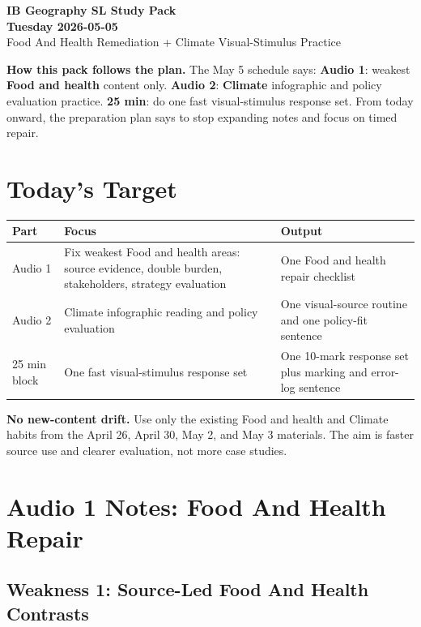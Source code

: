\documentclass[11pt,a4paper]{article}
\newcommand{\term}[1]{\textcolor{HeadingBlue}{\textbf{#1}}}
\newcommand{\boxnote}[3]{%
\noindent\colorbox{#1}{%
  \begin{minipage}{0.965\textwidth}
  \sffamily
  \textbf{\textcolor{HeadingBlue}{#2}} #3
  \end{minipage}
}}
\begin{document}
\begin{center}
  {\sffamily\bfseries\color{HeadingBlue}\LARGE IB Geography SL Study Pack}\\[0.25em]
  {\sffamily\bfseries\color{AccentTeal}\Large Tuesday 2026-05-05}\\[0.35em]
  {\sffamily\color{TextInk}Food And Health Remediation + Climate Visual-Stimulus Practice}
\end{center}

\boxnote{SoftBlue}{How this pack follows the plan.}{The May 5 schedule says:
\term{Audio 1}: weakest \term{Food and health} content only.
\term{Audio 2}: \term{Climate} infographic and policy evaluation practice.
\term{25 min}: do one fast visual-stimulus response set. From today onward,
the preparation plan says to stop expanding notes and focus on timed repair.}

\section{Today's Target}

\begin{tabularx}{\textwidth}{L{0.2\textwidth}Y L{0.25\textwidth}}
\toprule
\textbf{Part} & \textbf{Focus} & \textbf{Output} \\
\midrule
Audio 1 & Fix weakest Food and health areas: source evidence, double burden,
stakeholders, strategy evaluation & One Food and health repair checklist \\
Audio 2 & Climate infographic reading and policy evaluation & One visual-source
routine and one policy-fit sentence \\
25 min block & One fast visual-stimulus response set & One 10-mark response
set plus marking and error-log sentence \\
\bottomrule
\end{tabularx}

\boxnote{SoftRed}{No new-content drift.}{Use only the existing Food and health
and Climate habits from the April 26, April 30, May 2, and May 3 materials.
The aim is faster source use and clearer evaluation, not more case studies.}

\section{Audio 1 Notes: Food And Health Repair}

\subsection{Weakness 1: Source-Led Food And Health Contrasts}
\end{document}

